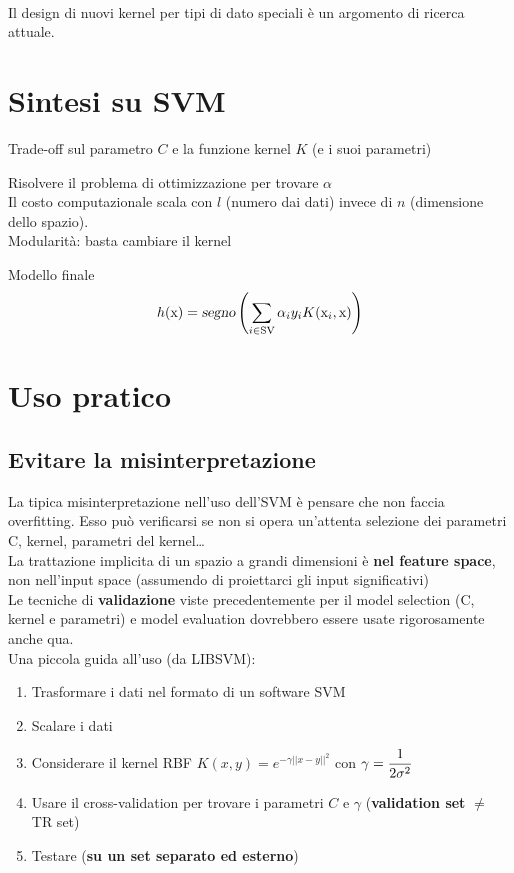 \documentclass[10pt]{book}
\begin{document}
\paragraph{} Il design di nuovi kernel per tipi di dato speciali è un argomento di ricerca attuale.
\section{Sintesi su SVM}
\begin{list}{}{}
	\item Trade-off sul parametro $C$ e la funzione kernel $K$ (e i suoi parametri)
	\item Risolvere il problema di ottimizzazione per trovare $\alpha$\\
	Il costo computazionale scala con $l$ (numero dai dati) invece di $n$ (dimensione dello spazio).\\
	Modularità: basta cambiare il kernel
	\item Modello finale
	$$h(\text{x}) = \textsl{segno}\left(\sum_{i\in \text{SV}} \alpha_i y_i K(\text{x}_i, \text{x}) \right)$$
\end{list}
\section{Uso pratico}
\subsection{Evitare la misinterpretazione}
La tipica misinterpretazione nell'uso dell'SVM è pensare che non faccia overfitting. Esso può verificarsi se non si opera un'attenta selezione dei parametri C, kernel, parametri del kernel\ldots\\
La trattazione implicita di un spazio a grandi dimensioni è \textbf{nel feature space}, non nell'input space (assumendo di proiettarci gli input significativi)\\
Le tecniche di \textbf{validazione} viste precedentemente per il model selection (C, kernel e parametri) e model evaluation dovrebbero essere usate rigorosamente anche qua.\\
Una piccola guida all'uso (da LIBSVM):
\begin{enumerate}
	\item Trasformare i dati nel formato di un software SVM
	\item Scalare i dati
	\item Considerare il kernel RBF $K(x, y) = e^{-\gamma||x-y||^2}$ con $\gamma = \mathlarger{\frac{1}{2\sigma^2}}$
	\item Usare il cross-validation per trovare i parametri $C$ e $\gamma$ (\textbf{validation set} $\neq$ TR set)
	\item Testare (\textbf{su un set separato ed esterno})
\end{enumerate}
\end{document}
